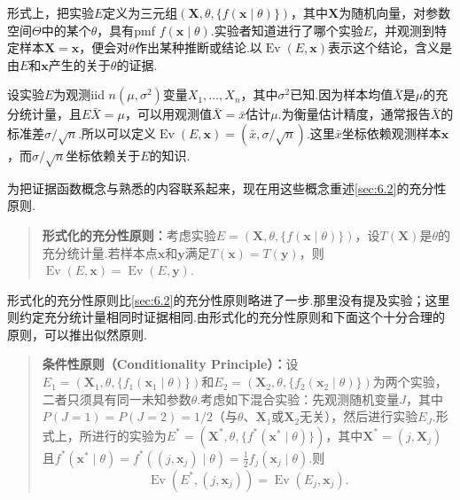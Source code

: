 形式上，把实验$E$定义为三元组$(\boldsymbol X,\theta,\{f(\boldsymbol x\mid\theta)\})$，其中$\boldsymbol X$为随机向量，对参数空间$\Theta$中的某个$\theta$，具有pmf $f(\boldsymbol x\mid\theta)$.实验者知道进行了哪个实验$E$，并观测到特定样本$\boldsymbol X=\boldsymbol x$，便会对$\theta$作出某种推断或结论.以$\operatorname{Ev}(E,\boldsymbol x)$表示这个结论，含义是由$E$和$\boldsymbol x$产生的关于$\theta$的证据.
\begin{example}[证据函数]\label{ex:6.3.4}
设实验$E$为观测iid $n(\mu,\sigma^2)$变量$X_1,\ldots,X_n$，其中$\sigma^2$已知.因为样本均值$\bar X$是$\mu$的充分统计量，且$E\bar X=\mu$，可以用观测值$\bar X=\bar x$估计$\mu$.为衡量估计精度，通常报告$\bar X$的标准差$\sigma/\sqrt n$.所以可以定义$\operatorname{Ev}(E,\boldsymbol x)=(\bar x,\sigma/\sqrt n)$.这里$\bar x$坐标依赖观测样本$\boldsymbol x$，而$\sigma/\sqrt n$坐标依赖关于$E$的知识.
\end{example}
为把证据函数概念与熟悉的内容联系起来，现在用这些概念重述\autoref{sec:6.2}的充分性原则.
\begin{quote}
\textbf{形式化的充分性原则：}考虑实验$E=(\boldsymbol X,\theta,\{f(\boldsymbol x\mid\theta)\})$，设$T(\boldsymbol X)$是$\theta$的充分统计量.若样本点$\boldsymbol x$和$\boldsymbol y$满足$T(\boldsymbol x)=T(\boldsymbol y)$，则$\operatorname{Ev}(E,\boldsymbol x)=\operatorname{Ev}(E,\boldsymbol y)$.
\end{quote}
形式化的充分性原则比\autoref{sec:6.2}的充分性原则略进了一步.那里没有提及实验；这里则约定充分统计量相同时证据相同.由形式化的充分性原则和下面这个十分合理的原则，可以推出似然原则.
\begin{quote}
\textbf{条件性原则（Conditionality Principle）：}设$E_1=(\boldsymbol X_1,\theta,\{f_1(\boldsymbol x_1\mid\theta)\})$和$E_2=(\boldsymbol X_2,\theta,\{f_2(\boldsymbol x_2\mid\theta)\})$为两个实验，二者只须具有同一未知参数$\theta$.考虑如下混合实验：先观测随机变量$J$，其中$P(J=1)=P(J=2)=1/2$（与$\theta$、$\boldsymbol X_1$或$\boldsymbol X_2$无关），然后进行实验$E_J$.形式上，所进行的实验为$E^*=(\boldsymbol X^*,\theta,\{f^*(\boldsymbol x^*\mid\theta)\})$，其中$\boldsymbol X^*=(j,\boldsymbol X_j)$且$f^*(\boldsymbol x^*\mid\theta)=f^*((j,\boldsymbol x_j)\mid\theta)=\tfrac12f_j(\boldsymbol x_j\mid\theta)$.则
\begin{equation}\label{eq:6.3.2}
\operatorname{Ev}(E^*,(j,\boldsymbol x_j))=\operatorname{Ev}(E_j,\boldsymbol x_j).
\end{equation}
\end{quote}
